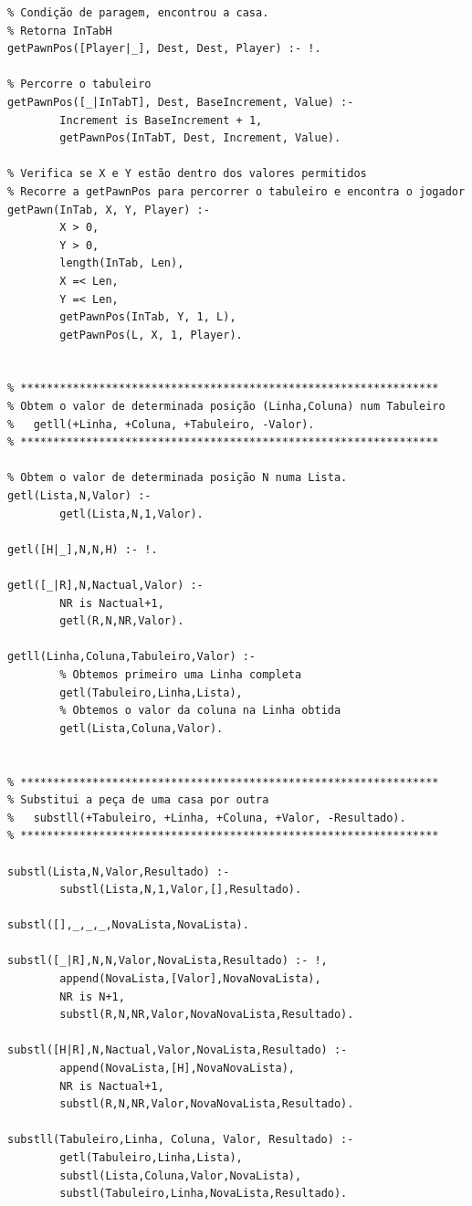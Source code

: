 \documentclass[15pt,a4paper]{article}
\begin{document}
\begin{lstlisting}
% Condição de paragem, encontrou a casa.
% Retorna InTabH
getPawnPos([Player|_], Dest, Dest, Player) :- !.

% Percorre o tabuleiro
getPawnPos([_|InTabT], Dest, BaseIncrement, Value) :-
		Increment is BaseIncrement + 1,
		getPawnPos(InTabT, Dest, Increment, Value).

% Verifica se X e Y estão dentro dos valores permitidos
% Recorre a getPawnPos para percorrer o tabuleiro e encontra o jogador
getPawn(InTab, X, Y, Player) :-
		X > 0,
		Y > 0,
		length(InTab, Len),
		X =< Len,
		Y =< Len,
		getPawnPos(InTab, Y, 1, L),
		getPawnPos(L, X, 1, Player).

        
% ****************************************************************
% Obtem o valor de determinada posição (Linha,Coluna) num Tabuleiro
%	getll(+Linha, +Coluna, +Tabuleiro, -Valor).
% ****************************************************************

% Obtem o valor de determinada posição N numa Lista.
getl(Lista,N,Valor) :-
		getl(Lista,N,1,Valor).

getl([H|_],N,N,H) :- !.

getl([_|R],N,Nactual,Valor) :-
		NR is Nactual+1,
		getl(R,N,NR,Valor).

getll(Linha,Coluna,Tabuleiro,Valor) :-
		% Obtemos primeiro uma Linha completa
		getl(Tabuleiro,Linha,Lista),
		% Obtemos o valor da coluna na Linha obtida
		getl(Lista,Coluna,Valor).
                 
                 
% ****************************************************************
% Substitui a peça de uma casa por outra
%	substll(+Tabuleiro, +Linha, +Coluna, +Valor, -Resultado).
% ****************************************************************

substl(Lista,N,Valor,Resultado) :-
        substl(Lista,N,1,Valor,[],Resultado).

substl([],_,_,_,NovaLista,NovaLista).

substl([_|R],N,N,Valor,NovaLista,Resultado) :- !,
		append(NovaLista,[Valor],NovaNovaLista),
		NR is N+1,
		substl(R,N,NR,Valor,NovaNovaLista,Resultado).

substl([H|R],N,Nactual,Valor,NovaLista,Resultado) :-
		append(NovaLista,[H],NovaNovaLista),
		NR is Nactual+1,
		substl(R,N,NR,Valor,NovaNovaLista,Resultado).

substll(Tabuleiro,Linha, Coluna, Valor, Resultado) :-
		getl(Tabuleiro,Linha,Lista),
		substl(Lista,Coluna,Valor,NovaLista),
		substl(Tabuleiro,Linha,NovaLista,Resultado).


\end{lstlisting}
\end{document}
